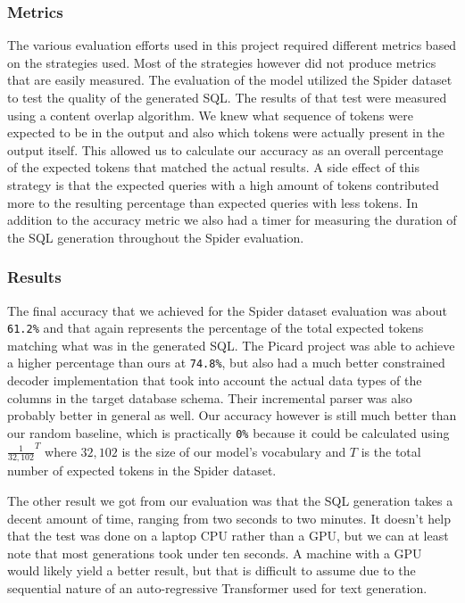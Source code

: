 \documentclass[11pt]{article}
\begin{document}
\subsubsection{Metrics}

The various evaluation efforts used in this project required different metrics based on the strategies used. Most of the strategies however did not produce metrics that are easily measured. The evaluation of the model utilized the Spider dataset to test the quality of the generated SQL. The results of that test were measured using a content overlap algorithm. We knew what sequence of tokens were expected to be in the output and also which tokens were actually present in the output itself. This allowed us to calculate our accuracy as an overall percentage of the expected tokens that matched the actual results. A side effect of this strategy is that the expected queries with a high amount of tokens contributed more to the resulting percentage than expected queries with less tokens. In addition to the accuracy metric we also had a timer for measuring the duration of the SQL generation throughout the Spider evaluation.

\subsubsection{Results}

The final accuracy that we achieved for the Spider dataset evaluation was about \texttt{61.2\%} and that again represents the percentage of the total expected tokens matching what was in the generated SQL. The Picard project was able to achieve a higher percentage than ours at \texttt{74.8\%}, but also had a much better constrained decoder implementation that took into account the actual data types of the columns in the target database schema. Their incremental parser was also probably better in general as well. Our accuracy however is still much better than our random baseline, which is practically \texttt{0\%} because it could be calculated using $\frac{1}{32,102}^{T}$ where $32,102$ is the size of our model's vocabulary and $T$ is the total number of expected tokens in the Spider dataset.

The other result we got from our evaluation was that the SQL generation takes a decent amount of time, ranging from two seconds to two minutes. It doesn't help that the test was done on a laptop CPU rather than a GPU, but we can at least note that most generations took under ten seconds. A machine with a GPU would likely yield a better result, but that is difficult to assume due to the sequential nature of an auto-regressive Transformer used for text generation.
\end{document}
